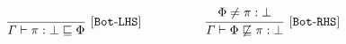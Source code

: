  \begin{gather*}
  \codeme{\frac{
\begin{matrix}
\end{matrix}
}{\text{\code{ \Gamma  \vdash \pi : \bott   \CONTAIN \effect }}}\ [Bot\text{-}LHS]}
\qquad\qquad\quad
\codeme{\frac{
\begin{matrix}
\effect \neq  \pi : \bott 
\end{matrix}
}{\text{\code{\Gamma  \vdash  \effect \not\CONTAIN  \pi : \bott }}} \ \codeme{  [Bot\text{-}RHS]} }
\end{gather*}
